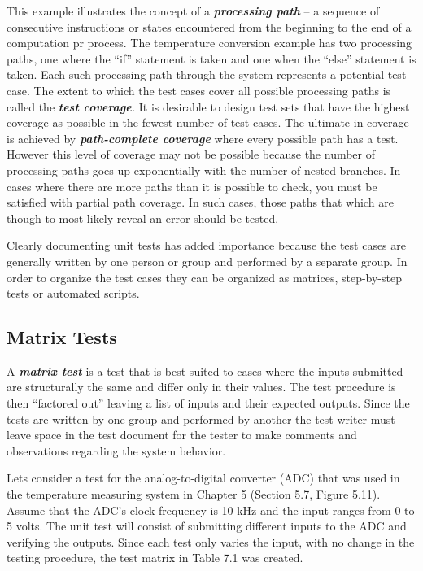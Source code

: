 This example illustrates the concept of a \emph{\textbf{processing
path}} -- a sequence of consecutive instructions or states encountered
from the beginning to the end of a computation pr process. The
temperature conversion example has two processing paths, one where the
``if'' statement is taken and one when the ``else'' statement is taken.
Each such processing path through the system represents a potential test
case. The extent to which the test cases cover all possible processing
paths is called the \emph{\textbf{test coverage}.} It is desirable to
design test sets that have the highest coverage as possible in the
fewest number of test cases. The ultimate in coverage is achieved by
\textbf{\emph{path-complete coverage}} where every possible path has a
test. However this level of coverage may not be possible because the
number of processing paths goes up exponentially with the number of
nested branches. In cases where there are more paths than it is possible
to check, you must be satisfied with partial path coverage. In such
cases, those paths that which are though to most likely reveal an error
should be tested.

Clearly documenting unit tests has added importance because the test
cases are generally written by one person or group and performed by a
separate group. In order to organize the test cases they can be
organized as matrices, step-by-step tests or automated scripts.

\subsection*{Matrix Tests}
\label{subsection:matrix-tests}

A \emph{\textbf{matrix test}} is a test that is best suited to cases
where the inputs submitted are structurally the same and differ only in
their values. The test procedure is then ``factored out'' leaving a list
of inputs and their expected outputs. Since the tests are written by one
group and performed by another the test writer must leave space in the
test document for the tester to make comments and observations regarding
the system behavior.

Lets consider a test for the analog-to-digital converter (ADC) that was
used in the temperature measuring system in Chapter 5 (Section 5.7,
Figure 5.11). Assume that the ADC's clock frequency is 10 kHz and the
input ranges from 0 to 5 volts. The unit test will consist of submitting
different inputs to the ADC and verifying the outputs. Since each test
only varies the input, with no change in the testing procedure, the test
matrix in Table 7.1 was created.

